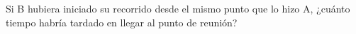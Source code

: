 Si B hubiera iniciado su recorrido desde el mismo punto que lo hizo A, ¿cuánto tiempo habría tardado en llegar al punto de reunión?

\begin{choices}
\end{choices}
